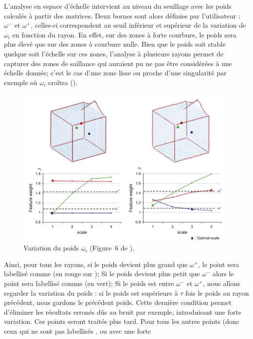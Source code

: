 L'analyse en espace d'échelle intervient au niveau du seuillage avec les poids
calculés à partir des matrices. Deux bornes sont alors définies par
l'utilisateur : $\omega^-$ et $\omega^+$, celles-ci correspondent au seuil
inférieur et supérieur de la variation de $\omega_i$ en fonction du rayon. En
effet, sur des zones à forte courbure, le poids sera plus élevé que sur des
zones à courbure nulle. Bien que le poids soit stable quelque soit l'échelle sur
ces zones, l'analyse à plusieurs rayons permet de capturer des zones de
saillance qui auraient pu ne pas être considérées à une échelle donnée; c'est le
cas d'une zone lisse ou proche d'une singularité par exemple où $\omega_i$ croîtra
().
%
\begin{figure}[ht]{
    \begin{center}
    \includegraphics[height=8cm]{images/Feature/Tensor_weight}
    \end{center}}
    \caption[Variation du poids $\omega_i$.]{Variation du poids $\omega_i$ (Figure~6 de \cite{Park2012}).
      \label{fig:tensor-weight}}
\end{figure}
%
Ainsi, pour tous les rayons, si le poids devient plus grand que $\omega^+$, le
point sera labellisé comme \Feature (en rouge sur
); Si le poids devient plus petit que
$\omega^-$ alors le point sera labellisé comme \NonFeature (en vert); Si le
poids est entre $\omega^-$ et $\omega^+$, nous allons regarder la variation du
poids : si le poids est supérieure à $\tau$ fois le poids au rayon précédent,
nous gardons le précédent poids. Cette dernière condition permet d'éliminer les
résultats erronés dûs au bruit par exemple, introduisant une forte
variation. Ces points seront traités plus tard. Pour tous les autres points
(donc ceux qui ne sont pas labellisés \Feature, \NonFeature ou avec une forte
